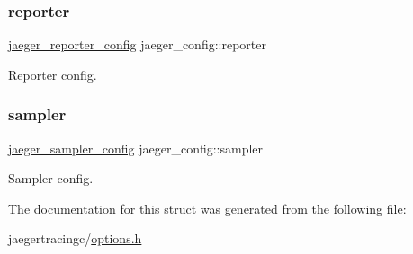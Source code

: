 \subsubsection{\texorpdfstring{reporter}{reporter}}
{\footnotesize\ttfamily \mbox{\hyperlink{structjaeger__reporter__config}{jaeger\+\_\+reporter\+\_\+config}} jaeger\+\_\+config\+::reporter}



Reporter config. 

\mbox{\label{structjaeger__config_a812f67f2637466de160309af68951713}} 
\subsubsection{\texorpdfstring{sampler}{sampler}}
{\footnotesize\ttfamily \mbox{\hyperlink{structjaeger__sampler__config}{jaeger\+\_\+sampler\+\_\+config}} jaeger\+\_\+config\+::sampler}



Sampler config. 



The documentation for this struct was generated from the following file\+:\begin{DoxyCompactItemize}
\item 
jaegertracingc/\mbox{\hyperlink{options_8h}{options.\+h}}\end{DoxyCompactItemize}
